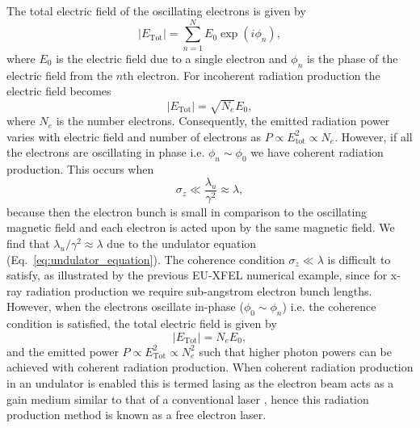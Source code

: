\documentclass[../main.tex]{subfiles}
\begin{document}
The total electric field of the oscillating electrons is given by
\begin{equation}
\lvert E_{\mathrm{Tot}}\rvert = \sum_{n=1}^{N}E_{0}\exp\left(i\phi_{n}\right),
\label{eq:undulator_bunch_electric_field}    
\end{equation}
where $E_{0}$ is the electric field due to a single electron and $\phi_{n}$ is the phase of the electric field from the $n$th electron. For incoherent radiation production the electric field becomes \cite{wolski2012fel} %
\begin{equation}
\lvert E_{\mathrm{Tot}}\rvert = \sqrt{N_{e}}E_{0},
\label{eq:incoherent_electric_field}
\end{equation}
where $N_{e}$ is the number electrons. Consequently, the emitted radiation power varies with electric field and number of electrons as $P \propto E_{\mathrm{tot}}^{2} \propto N_{e}$. However, if all the electrons are oscillating in phase i.e. $\phi_{n}\sim \phi_{0}$ we have coherent radiation production. This occurs when
\begin{equation}
\sigma_{z} \ll \frac{\lambda_{u}}{\gamma^{2}} \approx \lambda,
\label{eq:coherence_condition}
\end{equation}
because then the electron bunch is small in comparison to the oscillating magnetic field and each electron is acted upon by the same magnetic field. We find that $\lambda_{u}/\gamma^{2} \approx \lambda$ due to the undulator equation (Eq.~\ref{eq:undulator_equation}). The coherence condition $\sigma_{z} \ll \lambda$ is difficult to satisfy, as illustrated by the previous EU-XFEL numerical example, since for x-ray radiation production we require sub-angstrom electron bunch lengths. However, when the electrons oscillate in-phase ($\phi_{0}\sim \phi_{n}$) i.e. the coherence condition is satisfied, the total electric field is given by
\begin{equation}
\lvert E_{\mathrm{Tot}}\rvert = N_{e}E_{0},
\label{eq:coherent_electric_field}    
\end{equation}
and the emitted power $P \propto E_{\mathrm{Tot}}^{2} \propto N_{e}^{2}$ \cite{pellegrini2016physics} such that higher photon powers can be achieved with coherent radiation production. When coherent radiation production in an undulator is enabled this is termed lasing as the electron beam acts as a gain medium similar to that of a conventional laser \cite{brau1988free}, hence this radiation production method is known as a free electron laser. 
\end{document}
